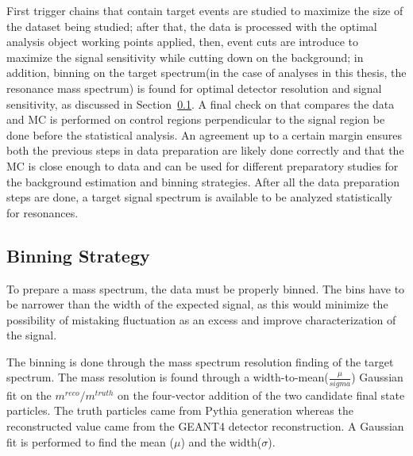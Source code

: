 First trigger chains that contain target events are studied to maximize the size of the dataset being studied; after that, the data is processed with the optimal analysis object working points applied, then, event cuts are introduce to maximize the signal sensitivity while cutting down on the background; in addition, binning on the target spectrum(in the case of analyses in this thesis, the resonance mass spectrum) is found for optimal detector resolution and signal sensitivity, as discussed in
Section~\ref{sec:binning}. A final check on that compares the data and MC is performed on control regions perpendicular to the signal region be done before the statistical analysis. An agreement up to a certain margin ensures both the previous steps in data preparation are likely done correctly and that the MC is close enough to data and can be used for different preparatory studies for the background estimation and binning strategies. After all the data preparation steps are done, a target signal spectrum is available to be analyzed statistically for resonances. 

\subsection{Binning Strategy} 
\label{sec:binning}

To prepare a mass spectrum, the data must be properly binned. The bins have to be narrower than the width of the expected signal, as this would minimize the possibility of mistaking fluctuation as an excess and improve characterization of the signal.

The binning is done through the mass spectrum resolution finding of the target spectrum. The mass resolution is found through a width-to-mean($\frac{\mu}{sigma}$) Gaussian fit on the $m^{reco}/m^{truth}$ on the four-vector addition of the two candidate final state particles. The truth particles came from Pythia generation whereas the reconstructed value came from the GEANT4 detector reconstruction. A Gaussian fit is performed to find the mean ($\mu$) and the width($\sigma$).


